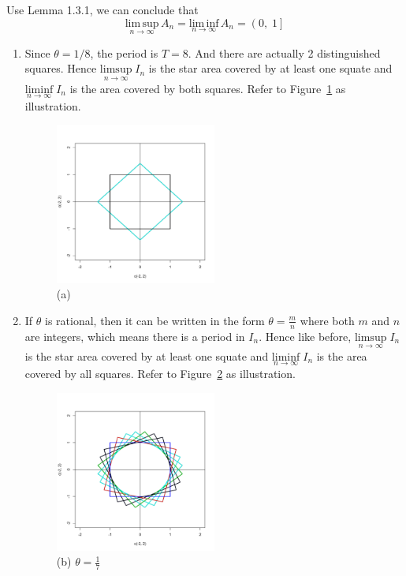 \begin{list}{1.9.}{}
\item
  Use Lemma 1.3.1, we can conclude that
  \[
    \underset{n\to\infty}{\mathrm{lim\,sup}}\,A_n = \underset{n\to\infty}{\mathrm{lim\,inf}}\,A_n
    = \left(0,\;1\right]
  \]
\item 
  \begin{enumerate}
  \item Since $\theta = 1/8 $, the period is $T=8$. And there are actually 2 distinguished squares. Hence $ \underset{n\to\infty}{\mathrm{limsup}}\;I_n$ is the star area covered by at least one squate and $ \underset{n\to\infty}{\mathrm{liminf}}\;I_n$ is the area covered by both squares. Refer to Figure~\ref{fig:1.9.7.a} as illustration.
    \begin{figure}[htbp]
      \centering
      \includegraphics[width=0.5\textwidth]{./Figures/1_9_7_a.pdf}
      \caption{(a)}
      \label{fig:1.9.7.a}
    \end{figure}

  \item If $\theta$ is rational, then it can be written in the form $\theta = \frac{m}{n}$ where both $m$ and $n$ are integers, which means there is a period in $I_n$. Hence like before, $ \underset{n\to\infty}{\mathrm{limsup}}\;I_n$ is the star area covered by at least one squate and $ \underset{n\to\infty}{\mathrm{liminf}}\;I_n$ is the area covered by all squares. Refer to Figure~\ref{fig:1.9.7.b} as illustration.
    \begin{figure}[htbp]
      \centering
      \includegraphics[width=0.5\textwidth]{./Figures/1_9_7_b.pdf}
      \caption{(b) $\theta = \frac{1}{7}$}
      \label{fig:1.9.7.b}
    \end{figure}
    

\end{enumerate}
\end{list}
